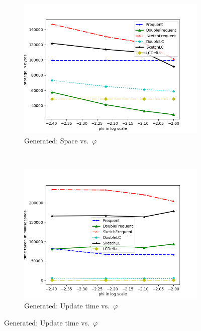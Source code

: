 \documentclass[sigconf,review=true,anonymous=true,screen]{acmart}
\renewcommand{\phi}{\varphi}
\begin{document}
\begin{figure}
\centering
\begin{subfigure}[b]{0.5\textwidth}
\includegraphics[width=\textwidth]{../Plots/storage_phi.png}
\caption{Generated: Space vs.~$\phi$}
\end{subfigure}
~
\begin{subfigure}[b]{0.5\textwidth}
\includegraphics[width=\textwidth]{../Plots/time_phi.png}
\caption{Generated: Update time vs.~$\phi$}
\end{subfigure}


\end{figure}
\end{document}
